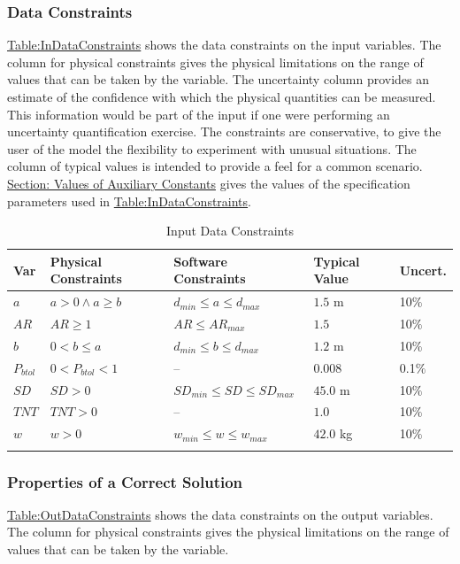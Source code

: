 \documentclass[12pt]{article}
\begin{document}
\subsubsection{Data Constraints}
\label{Sec:DataConstraints}
\hyperref[Table:InDataConstraints]{Table:InDataConstraints} shows the data constraints on the input variables. The column for physical constraints gives the physical limitations on the range of values that can be taken by the variable. The uncertainty column provides an estimate of the confidence with which the physical quantities can be measured. This information would be part of the input if one were performing an uncertainty quantification exercise. The constraints are conservative, to give the user of the model the flexibility to experiment with unusual situations. The column of typical values is intended to provide a feel for a common scenario. \hyperref[Sec:AuxConstants]{Section: Values of Auxiliary Constants} gives the values of the specification parameters used in \hyperref[Table:InDataConstraints]{Table:InDataConstraints}.

\begin{longtable}{l l l l l}
\toprule
\textbf{Var} & \textbf{Physical Constraints} & \textbf{Software Constraints} & \textbf{Typical Value} & \textbf{Uncert.}
\\
\midrule
\endhead
$a$ & $a>0\land{}a\geq{}b$ & ${d_{min}}\leq{}a\leq{}{d_{max}}$ & $1.5$ m & 10$\%$
\\
$AR$ & $AR\geq{}1$ & $AR\leq{}{AR_{max}}$ & $1.5$ & 10$\%$
\\
$b$ & $0<b\leq{}a$ & ${d_{min}}\leq{}b\leq{}{d_{max}}$ & $1.2$ m & 10$\%$
\\
${P_{btol}}$ & $0<{P_{btol}}<1$ & -- & $0.008$ & 0.1$\%$
\\
$SD$ & $SD>0$ & ${SD_{min}}\leq{}SD\leq{}{SD_{max}}$ & $45.0$ m & 10$\%$
\\
$TNT$ & $TNT>0$ & -- & $1.0$ & 10$\%$
\\
$w$ & $w>0$ & ${w_{min}}\leq{}w\leq{}{w_{max}}$ & $42.0$ kg & 10$\%$
\\
\bottomrule
\caption{Input Data Constraints}
\label{Table:InDataConstraints}
\end{longtable}
\subsubsection{Properties of a Correct Solution}
\label{Sec:CorSolProps}
\hyperref[Table:OutDataConstraints]{Table:OutDataConstraints} shows the data constraints on the output variables. The column for physical constraints gives the physical limitations on the range of values that can be taken by the variable.
\end{document}
